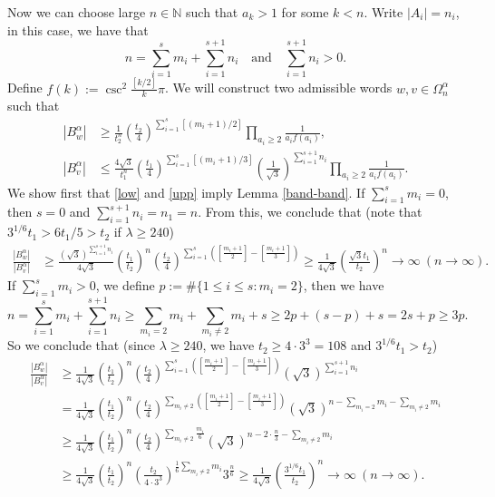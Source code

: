 \documentclass[reqno,11pt,graphicx,]{amsart}
\numberwithin{equation}{section}
\theoremstyle{plain}
\newcommand{\N}{{\mathbb N}}
\newcommand{\3}{\mathbf{3}}
\begin{document}
	Now we can choose large $n\in\N$ such that $a_k>1$ for some $k<n$. Write $|A_i|=n_i$, in this case, we have that
	\begin{equation*}
		n=\sum_{i=1}^{s}m_i+\sum_{i=1}^{s+1}n_{i}\quad\text{and}\quad \sum_{i=1}^{s+1}n_{i}>0.
	\end{equation*}  
	Define $f(k):=\csc^2\frac{[k/2]}{k}\pi$. We will construct two admissible words $w,v\in\Omega^{\alpha}_{n}$ such that
	\begin{align}
		|B^{\alpha}_w|&\geq\frac{1}{t_2^n}\left(\frac{t_2}{4}\right)^{\sum_{i=1}^{s}[(m_i+1)/2]}
		\prod_{a_{i}\geq2}\frac{1}{a_if(a_i)},\label{low}\\
		|B^{\alpha}_v|&\leq\frac{4\sqrt3}{t_1^n}\left(\frac{t_1}{4}\right)^{\sum_{i=1}^{s}[(m_i+1)/3]}\left(\frac{1}{\sqrt{3}}\right)^{\sum_{i=1}^{s+1}n_i}
		\prod_{a_{i}\geq2}\frac{1}{a_if(a_i)}.\label{upp}
	\end{align}
	We show first that \eqref{low} and \eqref{upp} imply Lemma \ref{band-band}. If $\sum_{i=1}^{s}m_i=0$, then $s=0$ and $\sum_{i=1}^{s+1}n_i=n_1=n$. From this, we conclude that (note that $3^{1/6}t_1>6t_1/5>t_2$ if $\lambda\geq240$)
	\begin{align*}
		\frac{|B^{\alpha}_w|}{|B^{\alpha}_v|}&\geq \frac{(\sqrt{3})^{\sum_{i=1}^{s+1}n_i}}{4\sqrt3}\left(\frac{t_1}{t_2}\right)^n
		\left(\frac{t_2}{4}\right)^{\sum_{i=1}^{s}\left([\frac{m_i+1}{2}]-[\frac{m_i+1}{3}]\right)}
		\geq\frac{1}{4\sqrt3}\left(\frac{\sqrt{3}t_1}{t_2}\right)^n\to\infty\ (n\to\infty).
	\end{align*}
	If $\sum_{i=1}^{s}m_i>0$, we define $p:=\#\{1\leq i\leq s:m_{i}=2\}$, then we have
	\begin{equation*}
		n=\sum_{i=1}^{s}m_i+\sum_{i=1}^{s+1}n_{i}\geq\sum_{m_i=2}m_i+\sum_{m_{i}\neq2}m_i+s\geq 2p+(s-p)+s=2s+p\geq 3p.
	\end{equation*}
	So we conclude that (since $\lambda\geq240$, we have $t_2\geq4\cdot3^3=108$ and $3^{1/6}t_1>t_2$)
	\begin{align*}
		\frac{|B^{\alpha}_w|}{|B^{\alpha}_v|}&\geq\frac{1}{4\sqrt3}\left(\frac{t_1}{t_2}\right)^n\left(\frac{t_2}{4}\right)^{\sum_{i=1}^{s}\left([\frac{m_i+1}{2}]-[\frac{m_i+1}{3}]\right)}(\sqrt{3})^{\sum_{i=1}^{s+1}n_i}\\
		&=\frac{1}{4\sqrt3}\left(\frac{t_1}{t_2}\right)^n\left(\frac{t_2}{4}\right)^{\sum_{m_{i}\neq2}\left([\frac{m_i+1}{2}]-[\frac{m_i+1}{3}]\right)}(\sqrt{3})^{n-\sum_{m_i=2}m_i-\sum_{m_i\neq2}m_i}\\
		&\geq\frac{1}{4\sqrt3}\left(\frac{t_1}{t_2}\right)^n\left(\frac{t_2}{4}\right)^{\sum_{m_{i}\neq2}\frac{m_i}{6}}(\sqrt{3})^{n-2\cdot\frac{n}{3}-\sum_{m_i\neq2}m_i}\\
		&\geq\frac{1}{4\sqrt3}\left(\frac{t_1}{t_2}\right)^n\left(\frac{t_2}{4\cdot3^{3}}\right)^{\frac{1}{6}\sum_{m_{i}\neq2}m_i}3^{\frac{n}{6}}
		\geq\frac{1}{4\sqrt3}\left(\frac{3^{1/6}t_1}{t_2}\right)^n\to\infty\ (n\to\infty).
	\end{align*}
	
\end{document}
